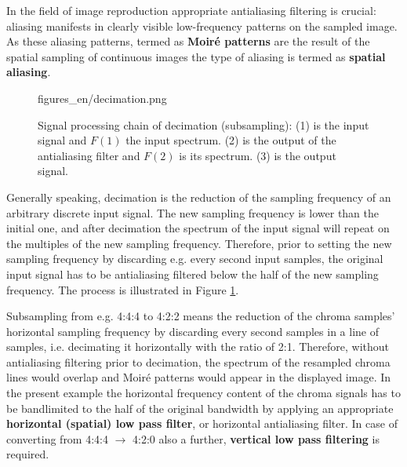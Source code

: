 In the field of image reproduction appropriate antialiasing filtering is crucial: 
aliasing manifests in clearly visible low-frequency patterns on the sampled image.
As these aliasing patterns, termed as \textbf{Moiré patterns} are the result of the spatial sampling of continuous images the type of aliasing is termed as \textbf{spatial aliasing}.
\begin{figure}[]
	\centering
	\begin{overpic}[width = 0.8\columnwidth ]{figures_en/decimation.png}
 	\end{overpic}
	\caption{Signal processing chain of decimation (subsampling): 
	(1) is the input signal and $F(1)$ the input spectrum.
	(2) is the output of the antialiasing filter and $F(2)$ is its spectrum.
	(3) is the output signal.}
	\label{Fig:decimation}
\end{figure}

Generally speaking, decimation is the reduction of the sampling frequency of an arbitrary discrete input signal.
The new sampling frequency is lower than the initial one, and after decimation the spectrum of the input signal will repeat on the multiples of the new sampling frequency.
Therefore, prior to setting the new sampling frequency by discarding e.g. every second input samples, the original input signal has to be antialiasing filtered below the half of the new sampling frequency.
The process is illustrated in Figure \ref{Fig:decimation}.

\vspace{3mm}
Subsampling from e.g. 4:4:4 to 4:2:2 means the reduction of the chroma samples' horizontal sampling frequency by discarding every second samples in a line of samples, i.e. decimating it horizontally with the ratio of 2:1.
Therefore, without antialiasing filtering prior to decimation, the spectrum of the resampled chroma lines would overlap and Moiré patterns would appear in the displayed image.
In the present example the horizontal frequency content of the chroma signals has to be bandlimited to the half of the original bandwidth  by applying an appropriate \textbf{horizontal (spatial) low pass filter}, or horizontal antialiasing filter.
In case of converting from 4:4:4 $\rightarrow$ 4:2:0 also a further, \textbf{vertical low pass filtering} is required.

